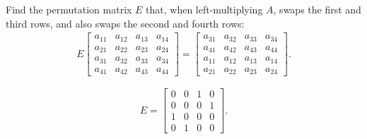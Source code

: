 \documentclass[reqno]{exam}
\begin{document}
\begin{questions}
\question[5]
    Find the permutation matrix $E$ that, when left-multiplying $A$, swaps the first and third rows, and also swaps the second and fourth rows:
    \begin{align*}
      E \begin{bmatrix}
          a_{11} & a_{12} & a_{13} & a_{14} \\
          a_{21} & a_{22} & a_{23} & a_{24} \\
          a_{31} & a_{32} & a_{33} & a_{34} \\
          a_{41} & a_{42} & a_{43} & a_{44}
        \end{bmatrix}
      =
      \begin{bmatrix}
          a_{31} & a_{32} & a_{33} & a_{34} \\
          a_{41} & a_{42} & a_{43} & a_{44} \\
          a_{11} & a_{12} & a_{13} & a_{14} \\
          a_{21} & a_{22} & a_{23} & a_{24}
      \end{bmatrix}.
    \end{align*}
    \begin{solution}
      $$E = \begin{bmatrix}
          0 & 0 & 1 & 0 \\
          0 & 0 & 0 & 1 \\
          1 & 0 & 0 & 0 \\
          0 & 1 & 0 & 0
        \end{bmatrix}.
      $$
    \end{solution}


\end{questions}
\end{document}
